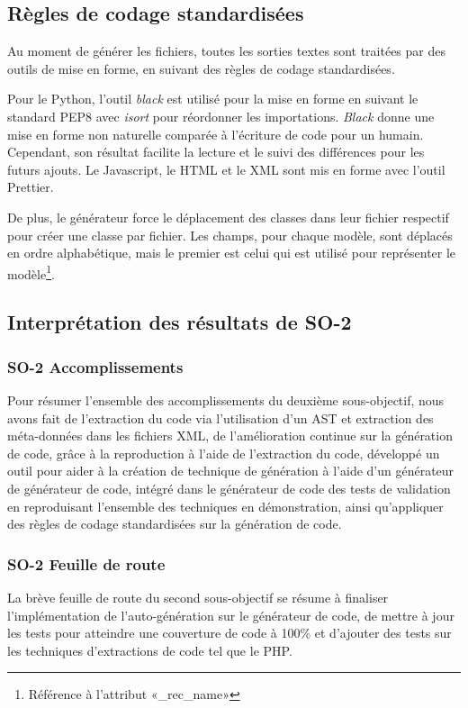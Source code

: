 \subsection {Règles de codage standardisées}

Au moment de générer les fichiers, toutes les sorties textes sont traitées par des outils de mise en forme, en suivant des règles de codage standardisées.

Pour le Python, l’outil \textit{black} est utilisé pour la mise en forme en suivant le standard PEP8 avec \textit{isort} pour réordonner les importations. \textit{Black} donne une mise en forme non naturelle comparée à l’écriture de code pour un humain. Cependant, son résultat facilite la lecture et le suivi des différences pour les futurs ajouts. Le Javascript, le HTML et le XML sont mis en forme avec l’outil Prettier.

De plus, le générateur force le déplacement des classes dans leur fichier respectif pour créer une classe par fichier. Les champs, pour chaque modèle, sont déplacés en ordre alphabétique, mais le premier est celui qui est utilisé pour représenter le modèle\footnote{Référence à l'attribut «\_rec\_name»}.

\subsection{Interprétation des résultats de SO-2}

\subsubsection{SO-2 Accomplissements}
Pour résumer l'ensemble des accomplissements du deuxième sous-objectif, nous avons fait de l'extraction du code via l’utilisation d’un AST et extraction des méta-données dans les fichiers XML, de l'amélioration continue sur la génération de code, grâce à la reproduction à l’aide de l’extraction du code, développé un outil pour aider à la création de technique de génération à l’aide d’un générateur de générateur de code, intégré dans le générateur de code des tests de validation en reproduisant l’ensemble des techniques en démonstration, ainsi qu'appliquer des règles de codage standardisées sur la génération de code.

\subsubsection{SO-2 Feuille de route}
La brève feuille de route du second sous-objectif se résume à finaliser l’implémentation de l'auto-génération sur le générateur de code, de mettre à jour les tests pour atteindre une couverture de code à 100\% et d'ajouter des tests sur les techniques d’extractions de code tel que le PHP.

